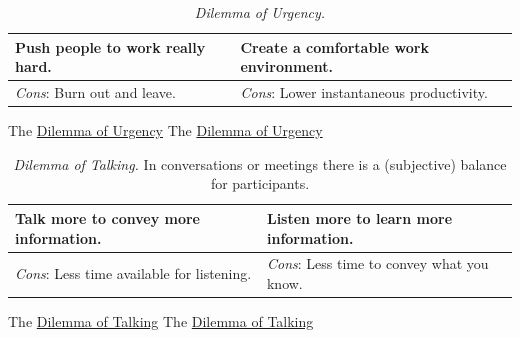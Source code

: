 \begin{center}
\begin{table}[H] %
\begin{tabular}{ | m{\dilemmatablewidth}| m{\dilemmatablewidth} | } 
  \hline
  \textbf{Push people to work really hard.} & 
  \textbf{Create a comfortable work environment.} \\ 
  \hline
  \textit{Cons}: Burn out and leave. & 
  \textit{Cons}: Lower instantaneous productivity. \\  
  \hline
\end{tabular}
\caption{
\textit{Dilemma of Urgency.}
}
\label{table:rate-of-work}
\end{table}
\end{center}

The \href{table:rate-of-work}{Dilemma of Urgency}
The \href{table:rate-of-work}{Dilemma of Urgency}


\begin{center}
\begin{table}[H] %
\begin{tabular}{ | m{\dilemmatablewidth}| m{\dilemmatablewidth} | } 
  \hline
  \textbf{Talk more to convey more information.} & 
  \textbf{Listen more to learn more information.} \\ 
  \hline
  \textit{Cons}: Less time available for listening. & 
  \textit{Cons}: Less time to convey what you know. \\  
  \hline
\end{tabular}
\caption{
\textit{Dilemma of Talking.}
In conversations or meetings there is a (subjective) balance for participants.
}
\label{table:talk-or-listen}
\end{table}
\end{center}

The \href{table:talk-or-listen}{Dilemma of Talking}
The \href{table:talk-or-listen}{Dilemma of Talking}




